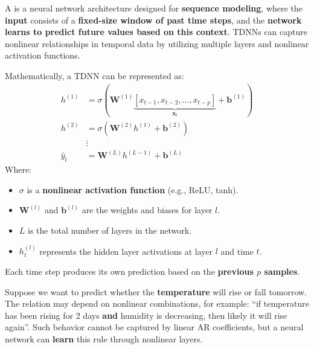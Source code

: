 \highspace
\begin{definitionbox}
    A  is a neural network architecture designed for \textbf{sequence modeling}, where the \textbf{input} consists of a \textbf{fixed-size window of past time steps}, and the \textbf{network learns to predict future values based on this context}. TDNNs can capture nonlinear relationships in temporal data by utilizing multiple layers and nonlinear activation functions.

    Mathematically, a TDNN can be represented as:
    \begin{equation}
        \begin{aligned}
            h^{(1)} &= \sigma\left(\mathbf{W}^{(1)} \underbrace{\left[x_{t-1}, x_{t-2}, \dots, x_{t-p}\right]}_{\mathbf{x}_t} + \mathbf{b}^{(1)}\right) \\[.3em]
            h^{(2)} &= \sigma\left(\mathbf{W}^{(2)} h^{(1)} + \mathbf{b}^{(2)}\right) \\[.3em]
            &\vdots \\[.3em]
            \hat{y}_t &= \mathbf{W}^{(L)} h^{(L-1)} + \mathbf{b}^{(L)}
        \end{aligned}
    \end{equation}
    Where:
    \begin{itemize}
        \item $\sigma$ is a \textbf{nonlinear activation function} (e.g., ReLU, tanh).
        \item $\mathbf{W}^{(l)}$ and $\mathbf{b}^{(l)}$ are the weights and biases for layer $l$.
        \item $L$ is the total number of layers in the network.
        \item $h^{(l)}_{t}$ represents the hidden layer activations at layer $l$ and time $t$.
    \end{itemize}
    Each time step produces its own prediction based on the \textbf{previous $p$ samples}.
\end{definitionbox}

\highspace
\begin{examplebox}
    Suppose we want to predict whether the \textbf{temperature} will rise or fall tomorrow. The relation may depend on nonlinear combinations, for example: ``if temperature has been rising for 2 days \textbf{and} humidity is decreasing, then likely it will rise again''. Such behavior cannot be captured by linear AR coefficients, but a neural network can \textbf{learn} this rule through nonlinear layers.
\end{examplebox}

